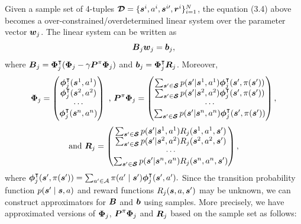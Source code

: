 Given a sample set of 4-tuples $\boldsymbol{\mathcal{D}} = \{\boldsymbol{s}^{i}, a^{i}, \boldsymbol{s}^{i\prime}, \boldsymbol{r}^i\}_{i=1}^N$, the equation (3.4) above becomes a over-constrained/overdetermined linear system over the parameter vector $\boldsymbol{w}_j$. The linear system can be written as
$$\boldsymbol{B}_j\boldsymbol{w}_j = \boldsymbol{b}_j,$$
where $\boldsymbol{B}_j = \boldsymbol{\Phi}_j^{\intercal}(\boldsymbol{\Phi}_j - \gamma \boldsymbol{P}^{\pi}\boldsymbol{\Phi}_j )$ and $\boldsymbol{b}_j =\boldsymbol{\Phi}_j^{\intercal} \boldsymbol{R}_j$. Moreover,
$$\boldsymbol{\Phi}_j = \begin{pmatrix}
\boldsymbol{\phi}_j^\intercal(\boldsymbol{s}^1,a^1)  \\
\boldsymbol{\phi}_j^\intercal(\boldsymbol{s}^2,a^2) \\
\cdots\\
\boldsymbol{\phi}_j^\intercal(\boldsymbol{s}^n,a^n) \end{pmatrix}
\text{ , } 
\boldsymbol{P}^{\pi}\boldsymbol{\Phi}_j = \begin{pmatrix}
\sum_{\boldsymbol{s}^{\prime} \in \boldsymbol{\mathcal{S}}}  p(\boldsymbol{s}^{\prime} | \boldsymbol{s}^1, a^1)\boldsymbol{\phi}_j^\intercal(\boldsymbol{s}^{\prime},\pi(\boldsymbol{s}^{\prime})) \\
\sum_{\boldsymbol{s}^{\prime} \in \boldsymbol{\mathcal{S}}}  p(\boldsymbol{s}^{\prime} | \boldsymbol{s}^2, a^2)\boldsymbol{\phi}_j^\intercal(\boldsymbol{s}^{\prime},\pi(\boldsymbol{s}^{\prime})) \\
\cdots\\
\sum_{\boldsymbol{s}^{\prime} \in \boldsymbol{\mathcal{S}}}  p(\boldsymbol{s}^{\prime} | \boldsymbol{s}^n, a^n)\boldsymbol{\phi}_j^\intercal(\boldsymbol{s}^{\prime},\pi(\boldsymbol{s}^{\prime})) \end{pmatrix},$$
$$\text{and } \boldsymbol{R}_j=  \begin{pmatrix} \sum_{\boldsymbol{s}^{\prime} \in \boldsymbol{\mathcal{S}}}  p(\boldsymbol{s}^{\prime} | \boldsymbol{s}^1, a^1) R_j(\boldsymbol{s}^1, a^1, \boldsymbol{s}^{\prime}) \\
\sum_{\boldsymbol{s}^{\prime} \in \boldsymbol{\mathcal{S}}}  p(\boldsymbol{s}^{\prime} | \boldsymbol{s}^2, a^2) R_j(\boldsymbol{s}^2, a^2, \boldsymbol{s}^{\prime}) \\
\cdots \\
\sum_{\boldsymbol{s}^{\prime} \in \boldsymbol{\mathcal{S}}}  p(\boldsymbol{s}^{\prime} | \boldsymbol{s}^n, a^n) R_j(\boldsymbol{s}^n, a^n, \boldsymbol{s}^{\prime})\end{pmatrix},$$
where $\boldsymbol{\phi}_j^\intercal(\boldsymbol{s}^{\prime},\pi(\boldsymbol{s}^{\prime})) = \sum_{a^{\prime} \in \mathcal{A}} \pi(a^{\prime} \mid \boldsymbol{s}^{\prime} )  \boldsymbol{\phi}_j^\intercal(\boldsymbol{s}^{\prime}, a^{\prime}).$
Since the transition probability function $p(\boldsymbol{s}^{\prime} \mid \boldsymbol{s}, a)$ and reward functions $R_j(\boldsymbol{s}, a, \boldsymbol{s}^{\prime})$ may be unknown,  we can construct approximators for $\boldsymbol{B}$ and $\boldsymbol{b}$ using samples. More precisely, we have approximated versions of $\boldsymbol{\Phi}_j$, $\boldsymbol{P}^{\pi}\boldsymbol{\Phi}_j$ and $\boldsymbol{R}_j$ based on the sample set as follows:
